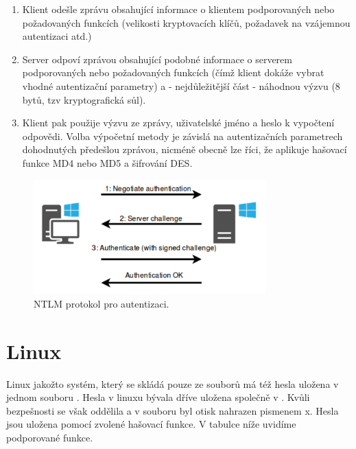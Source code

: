 \begin{enumerate}
	\item Klient odešle zprávu obsahující informace o klientem podporovaných nebo požadovaných funkcích (velikosti kryptovacích klíčů, požadavek na vzájemnou autentizaci atd.)
	\item Server odpoví zprávou obsahující podobné informace o serverem podporovaných nebo požadovaných funkcích (čímž klient dokáže vybrat vhodné autentizační parametry) a - nejdůležitější část - náhodnou výzvu (8 bytů, tzv kryptografická sůl).
	\item Klient pak použije výzvu ze zprávy, uživatelské jméno a heslo k vypočtení odpovědi. Volba výpočetní metody je závislá na autentizačních parametrech dohodnutých předešlou zprávou, nicméně obecně lze říci, že aplikuje hašovací funkce MD4 nebo MD5 a šifrování DES.
\end{enumerate}

\begin{figure}[!ht]
	\centering
 	\includegraphics[width=0.8\textwidth, angle=0]{hesla-windows.png}
 	\caption[Hesla windows]{NTLM protokol pro autentizaci.}\label{fig:windows}
\end{figure}

\section{Linux}

Linux jakožto systém, který se skládá pouze ze souborů má též hesla uložena v jednom souboru . Hesla v linuxu bývala dříve uložena společně v . Kvůli bezpešnosti se však oddělila a v souboru byl otisk nahrazen pismenem x. Hesla jsou uložena pomocí zvolené hašovací funkce. V tabulce níže uvidíme podporované funkce.


